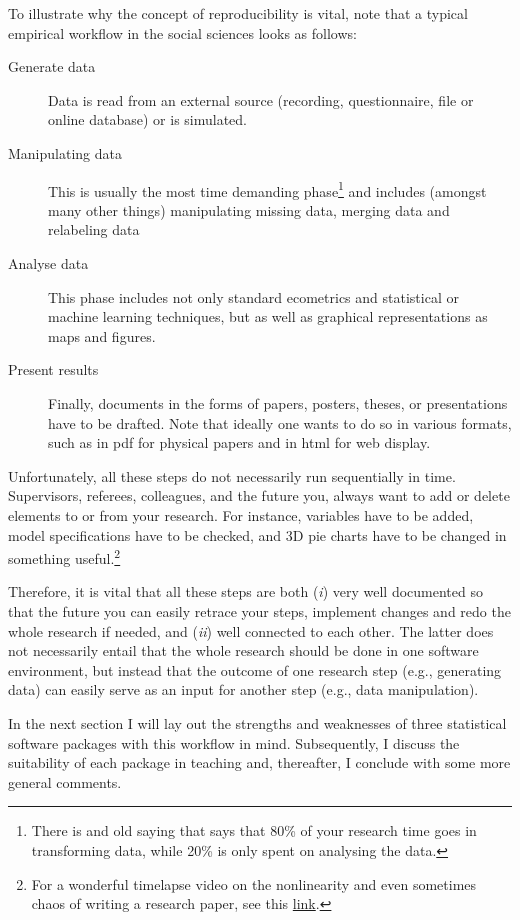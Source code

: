 \documentclass[fleqn,10pt]{SelfArx} %
\begin{document}
To illustrate why the concept of reproducibility is vital, note that a typical empirical workflow in the social sciences looks as follows:
\begin{description}
\item[Generate data] Data is read from an external source (recording, questionnaire, file or online database) or is simulated.  
\item[Manipulating data] This is usually the most time demanding
  phase\footnote{There is and old saying that says that 80\% of your research time
  goes in transforming data, while 20\% is only spent on analysing the data.} and
  includes (amongst many other things) manipulating missing data, merging data
  and relabeling data
\item[Analyse data] This phase includes not only standard ecometrics and
  statistical or machine learning techniques, but as well as graphical
  representations as maps and figures. 
\item[Present results] Finally, documents in the forms of papers, posters, theses, or
  presentations have to be drafted. Note that ideally one wants to do so in various
  formats, such as in pdf for physical papers and in html for web display. 
\end{description}
Unfortunately, all these steps do not necessarily run sequentially in time. Supervisors,
referees, colleagues, and the future you, always want to add or delete elements
to or from your research. For instance, variables have to be added,
model specifications have to be checked, and 3D pie charts have to be changed
in something useful.\footnote{For a wonderful timelapse video on the nonlinearity and even sometimes chaos of writing a research paper, see this \href{https://www.youtube.com/watch?v=hNENiG7LAnc}{link}.}

Therefore, it is vital that all these steps are both (\emph{i}) very well
documented so that the future you can easily retrace your steps, implement
changes and redo the whole research if needed, and (\emph{ii}) well connected to
each other. The latter does not necessarily entail that the whole research
should be done in one software environment, but instead that the outcome of one
research step (e.g., generating data) can easily serve as an input for another
step (e.g., data manipulation).

In the next section I will lay out the strengths and weaknesses of three
statistical software packages with this workflow in mind. Subsequently, I discuss the suitability of each package in teaching and, thereafter, I conclude with some more general comments.
\end{document}

